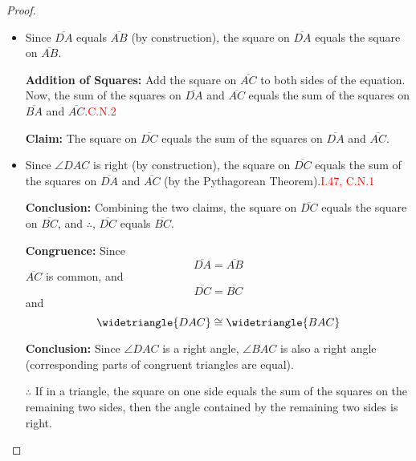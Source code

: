 \begin{proof}

\begin{itemize}

\item Since $\overline{DA}$ equals $\overline{AB}$ (by construction), the square on $\overline{DA}$ equals the square on $\overline{AB}$.


\textbf{Addition of Squares:}
Add the square on $\overline{AC}$ to both sides of the equation. Now, the sum of the squares on $\overline{DA}$ and $\overline{AC}$ equals the sum of the squares on $\overline{BA}$ and $\overline{AC}$.\hfill\textcolor{red}{C.N.2}

\textbf{Claim:} The square on $\overline{DC}$ equals the sum of the squares on $\overline{DA}$ and $\overline{AC}$.

\item Since $\angle{DAC}$ is right (by construction), the square on $\overline{DC}$ equals the sum of the squares on $\overline{DA}$ and $\overline{AC}$ (by the Pythagorean Theorem).\hfill\textcolor{red}{I.47, C.N.1}


\textbf{Conclusion:}
Combining the two claims, the square on $\overline{DC}$ equals the square on $\overline{BC}$, and $\therefore$, $\overline{DC}$ equals $\overline{BC}$.

\textbf{Congruence:}
Since
\[ \overline{DA} = \overline{AB}\] 
$\overline{AC}$ is common, and 
\[\overline{DC} = \overline{BC}\]
and 
\[\widetriangle{DAC} \cong \widetriangle{BAC}\] 

\textbf{Conclusion:}
Since $\angle{DAC}$ is a right angle, $\angle{BAC}$ is also a right angle (corresponding parts of congruent triangles are equal).

\textbf{$\therefore$} If in a triangle, the square on one side equals the sum of the squares on the remaining two sides, then the angle contained by the remaining two sides is right.

\end{itemize}

\end{proof}

\clearpage
